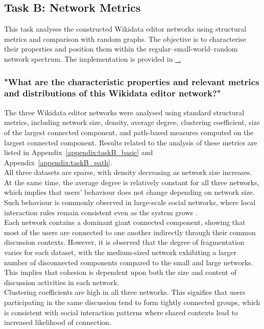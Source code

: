 \documentclass[acmsmall,nonacm,natbib=false]{acmart}
\newcommand{\githublink}[2]{\href{#1}{\faGithub\ #2}}
\begin{document}
\subsection{\LARGE{Task B: Network Metrics}}
\leavevmode \par \noindent
This task analyses the constructed Wikidata editor networks using structural metrics and comparison with random graphs. The objective is to characterise their properties and position them within the regular–small-world–random network spectrum. The implementation is provided in \githublink{https://github.kcl.ac.uk/k25038453/network-data-analysis-coursework/blob/main/notebooks/part\_1/taskB.ipynb}.

\subsubsection{\large{\textbf{"What are the characteristic properties and relevant metrics and distributions of this Wikidata editor network?"}}}
\leavevmode \par \noindent
The three Wikidata editor networks were analysed using standard structural metrics, including network size, density, average degree, clustering coefficient, size of the largest connected component, and path-based measures computed on the largest connected component. Results related to the analysis of these metrics are listed in Appendix~\ref{appendix:taskB_basic} and Appendix~\ref{appendix:taskB_path}. \\
All three datasets are sparse, with density decreasing as network size increases. At the same time, the average degree is relatively constant for all three networks, which implies that users' behaviour does not change depending on network size. Such behaviour is commonly observed in large-scale social networks, where local interaction rules remain consistent even as the system grows \cite{newman2010networks}.\\
Each network contains a dominant giant connected component, showing that most of the users are connected to one another indirectly through their common discussion contexts. However, it is observed that the degree of fragmentation varies for each dataset, with the medium-sized network exhibiting a larger number of disconnected components compared to the small and large networks. This implies that cohesion is dependent upon both the size and content of discussion activities in each network.\\
Clustering coefficients are high in all three networks.  This signifies that users participating in the same discussion tend to form tightly connected groups, which is consistent with social interaction patterns where shared contexts lead to increased likelihood of connection.\\
\end{document}

